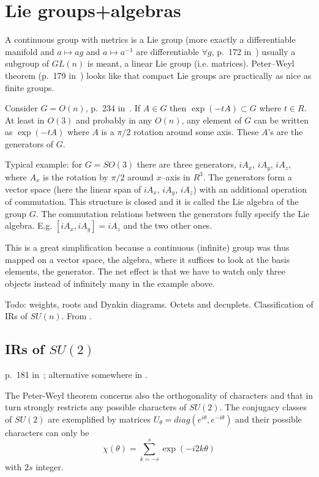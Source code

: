 \section{Lie groups+algebras}

A continuous group with metrics is a Lie group (more exactly a differentiable
manifold and $a\mapsto ag$ and $a\mapsto a^{-1}$ are differentiable $\forall
g$, p.~172 in~\cite{sternberg}) usually a subgroup of $GL(n)$ is meant, a
linear Lie group (i.e. matrices). Peter--Weyl theorem (p.~179
in~\cite{sternberg}) looks like that compact Lie groups are practically as
nice as finite groups.

Consider $G=O(n)$, p.~234 in~\cite{sternberg}. If $A\in G$ then
$\exp(-tA)\subset G$ where $t\in R$. At least in $O(3)$ and probably in any
$O(n)$, any element of $G$ can be written as $\exp(-tA)$ where $A$ is a
$\pi/2$ rotation around some axis. These $A$'s are the generators of $G$.

Typical example: for
$G=SO(3)$ there are three generators, $iA_x$, $iA_y$, $iA_z$, where $A_x$ is
the rotation by $\pi/2$ around $x$--axis in $R^3$. The generators form a
vector space (here the linear span of $iA_x$, $iA_y$, $iA_z$) with an
additional operation of commutation. This structure is closed and it is called
the Lie algebra of the group $G$. The commutation relations between the
generators fully specify the Lie algebra. E.g. $[iA_x,iA_y]=iA_z$
and the two other ones.

This is a great simplification because a continuous (infinite) group was thus
mapped on a vector space, the algebra, where it suffices to look at the basis
elements, the generator. The net effect is that we have to watch only three
objects instead of infinitely many in the example above.

Todo: weights, roots and Dynkin diagrams. Octets and decuplets. Classification
of IRs of $SU(n)$. From \cite{georgi}.


\subsection{IRs of $SU(2)$}

p.~181 in~\cite{sternberg}; alternative somewhere in \cite{georgi}.

The Peter-Weyl theorem concerns also the orthogonality of characters and that
in turn strongly restricts any possible characters of $SU(2)$. The conjugacy
classes of $SU(2)$ are exemplified by matrices
$U_\theta=diag(e^{i\theta},e^{-i\theta})$ and their possible characters can
only be
%
$$\chi(\theta)=\sum_{k=-s}^{s} \exp(-i2k\theta)$$
%
with $2s$ integer.

